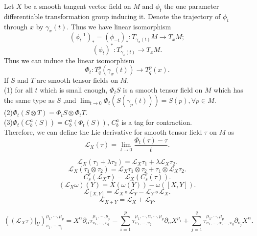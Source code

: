 \begin{newdef}
Let $X$ be a smooth tangent vector field on $M$ and $\phi_t$ the one parameter differentiable transformation group inducing it. Denote the trajectory of $\phi_t$ through $x$ by $\gamma_x(t)$. Thus we have linear isomorphism
\[(\phi_t^{-1})_{*} = (\phi_{-t})_{*} : T_{\gamma_x(t)}M \to T_xM;\]
\[(\phi_t)^* : T_{\gamma_x(t)}^* \to T_xM.\]
Thus we can induce the linear isomorphism
\[\Phi_t: T^p_q(\gamma_x(t)) \to T^p_q(x).\]
If $S$ and $T$ are smooth tensor fields on $M$,\\
(1) for all $t$ which is small enough, $\Phi_tS$ is a smooth tensor field on $M$ which has the same type as $S$ ,and $\lim_{t \to 0} \Phi_t(S(\gamma_p(t))) = S(p),\forall p \in M$.\\
(2)$\Phi_t(S \otimes T) = \Phi_tS \otimes \Phi_tT$.\\
(3)$\Phi_t(C^a_b(S)) = C^a_b(\Phi_t(S))$, $C^a_b$ is a tag for contraction.\\
Therefore, we can define the Lie derivative for smooth tensor field $\tau$ on $M$ as
\[\mathcal{L}_{X}(\tau) = \lim_{t \to 0}\frac{\Phi_t(\tau)-\tau}{t}.\]
\end{newdef}

\begin{newprop}
\[\mathcal{L}_X(\tau_1+\lambda \tau_2) = \mathcal{L}_X \tau_1 + \lambda \mathcal{L}_X \tau_2.\]
\[\mathcal{L}_X(\tau_1 \otimes \tau_2) = \mathcal{L}_X\tau_1 \otimes \tau_2 + \tau_1 \otimes \mathcal{L}_X \tau_2.\]
\[C^r_s(\mathcal{L}_X \tau) = \mathcal{L}_X(C^r_s(\tau)).\]
\[(\mathcal{L}_X \omega)(Y) = X(\omega(Y)) - \omega([X,Y]).\]
\[\mathcal{L}_{[X,Y]} = \mathcal{L}_X \circ \mathcal{L}_Y - \mathcal{L}_Y \circ \mathcal{L}_X .\]
\[\mathcal{L}_{X+Y} = \mathcal{L}_{X} + \mathcal{L}_{Y}.\]
\end{newprop}

\begin{newprop}
\[((\mathcal{L}_X \tau)|_U)^{\mu_1,\cdots,\mu_p}_{v_1,\cdots,v_q} = X^{\alpha} \partial_{\alpha} \tau^{\mu_1,\cdots,\mu_p}_{v_1,\cdots,v_q} - \sum_{i=1}^{p} \tau^{\mu_1,\cdots,\alpha,\cdots,\mu_p}_{v_1,\cdots,v_q} \partial_{\alpha} X^{\mu_i} + \sum_{j=1}^{q}\tau^{\mu_1,\cdots,\mu_p}_{v_1,\cdots,\alpha,\cdots,v_q} \partial_{v_j}X^{\alpha}.\]
\end{newprop}

